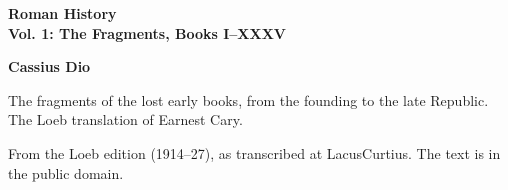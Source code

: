\documentclass[11pt,letterpaper]{article}
\begin{document}
\color{ink}

\begin{titlepage}
\centering
\vspace*{4em}
{\LARGE\bfseries\color{heading} Roman History\\[0.3em]Vol. 1: The Fragments, Books I--XXXV\par}
\vspace{2em}
{\Large\bfseries\color{heading} Cassius Dio\par}
\vspace{2.5em}
{\itshape\color{subhead}\parbox{0.8\linewidth}{\centering The fragments of the lost early books, from the founding to the late Republic. The Loeb translation of Earnest Cary.\par}}
\vfill
{\small From the Loeb edition (1914--27), as transcribed at LacusCurtius. The text is in the public domain.\par}
\vspace{2em}
\end{titlepage}

\tableofcontents


\end{document}
